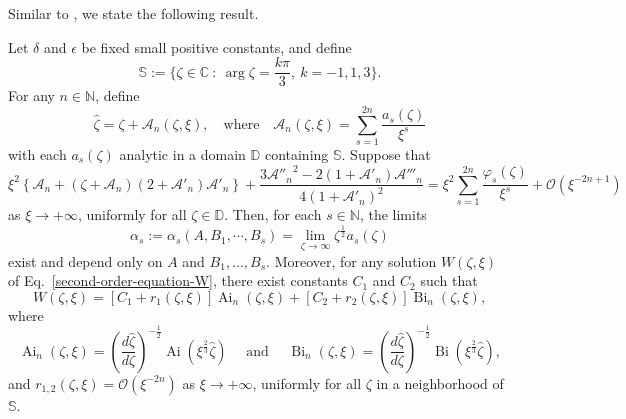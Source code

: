 \documentclass[12pt]{article}
\theoremstyle{plain}
\newtheorem{lemma}{\hskip\parindent Lemma}
\theoremstyle{definition}
\numberwithin{equation}{section}
\newcommand\Ai{\operatorname{Ai}}
\newcommand\Bi{\operatorname{Bi}}
\begin{document}
Similar to \cite[Lemma 1]{Long-Jiang-Li}, we state the following result.
\begin{lemma}\label{lem-higher-order-approximation-ODE-1}
Let $\delta$ and $\epsilon$ be fixed small positive constants, and define
\[
\mathbb{S}:=\{\zeta\in\mathbb{C}~:~\arg{\zeta}=\frac{k\pi}{3},~ k=-1, 1,3\}.
\]
For any $n\in\mathbb{N}$, define
\begin{equation}\label{eq-def-An}
\widehat{\zeta}=\zeta+\mathcal{A}_{n}(\zeta,\xi),\quad\text{where}\quad
\mathcal{A}_{n}(\zeta,\xi)=\sum\limits_{s=1}^{2n}\frac{a_{s}(\zeta)}{\xi^{s}}
\end{equation}
with each $a_{s}(\zeta)$ analytic in a domain $\mathbb{D}$ containing $\mathbb{S}$. Suppose that
\begin{equation}\label{eq-An-coeff-compare}
\xi^2\left\{\mathcal{A}_{n}+(\zeta+\mathcal{A}_{n})(2+\mathcal{A}'_{n})\mathcal{A}'_{n}\right\}+\frac{3{\mathcal{A}''_{n}}^{2}-2(1+\mathcal{A}'_{n})\mathcal{A}'''_{n}}{4(1+\mathcal{A}'_{n})^2}=\xi^2\sum\limits_{s=1}^{2n}\frac{\varphi_{s}(\zeta)}{\xi^{s}}+\mathcal{O}(\xi^{-2n+1})
\end{equation}
as $\xi\to+\infty$, uniformly for all $\zeta\in\mathbb{D}$.
Then, for each $s\in\mathbb{N}$, the limits
\begin{equation}\label{eq-def-alpha-s}
\alpha_{s}:=\alpha_{s}(A,B_{1},\cdots, B_{s})=\lim\limits_{\zeta\to\infty}\zeta^{\frac{1}{2}}a_{s}(\zeta)
\end{equation}
exist and depend only on $A$ and $B_{1}, \ldots, B_{s}$.
Moreover, for any solution $W(\zeta, \xi)$ of Eq.~\eqref{second-order-equation-W},
there exist constants $C_{1}$ and $C_{2}$ such that
\begin{equation}\label{eq-higher-approximation-ODE-1}
W(\zeta,\xi)=\left[C_{1}+r_{1}(\zeta,\xi)\right]\Ai_{n}(\zeta,\xi)
+\left[C_{2}+r_{2}(\zeta,\xi)\right]\Bi_{n}(\zeta,\xi),
\end{equation}
where
\begin{equation}
\Ai_{n}(\zeta,\xi)=\left(\frac{d\widehat{\zeta}}{d\zeta}\right)^{-\frac{1}{2}}\Ai\left(\xi^{\frac{2}{3}}\widehat{\zeta}\right)\quad \text{ and }\quad \Bi_{n}(\zeta,\xi)=\left(\frac{d\widehat{\zeta}}{d\zeta}\right)^{-\frac{1}{2}}\Bi\left(\xi^{\frac{2}{3}}\widehat{\zeta}\right),
\end{equation}
and $r_{1,2}(\zeta,\xi)=\mathcal{O}(\xi^{-2n})$
as $\xi\to+\infty$, uniformly for all $\zeta$ in a neighborhood of $\mathbb{S}$.
\end{lemma}
\end{document}
